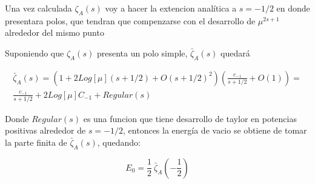 Una vez calculada $ \zeta _A (s) $  voy a hacer la extencion analítica a $ s=-1/2 $ en donde presentara polos, que tendran que compenzarse con el desarrollo de $ \mu ^{2s+1} $ alrededor del mismo punto

Suponiendo que $ \zeta _A (s) $ presenta un polo simple, $\bar {\zeta} _A (s) $ quedará

\begin{equation}
\begin{array}{c}

\bar{\zeta} _A (s) = 
\left(
1 + 2Log[\mu] (s+1/2) + O (s+1/2)^2
\right)
\left(
\frac{c _{-1} }{s+1/2} + O(1)
\right) = \\
\frac{c _{-1} }{s+1/2} + 2 Log[\mu] C _{-1} + Regular(s)
\end{array}
\end{equation}

Donde $Regular(s)$ es una funcion que tiene desarrollo de taylor en potencias positivas alrededor de $s=-1/2$, entonces la energía de vacio se obtiene de tomar la parte finita de $\bar{\zeta} _A (s) $, quedando:

\begin{equation}
    E _0 = \frac{1}{2}  \ \bar{\zeta} _A (-\frac{1}{2})
\label{eq.vacio}
\end{equation}